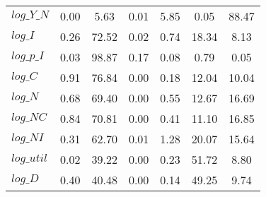 \begin{center}
\begin{longtable}{lcccccc}
$log\_Y\_N  $	 & 	        0.00	 & 	        5.63	 & 	        0.01	 & 	        5.85	 & 	        0.05	 & 	       88.47 \\ 
$log\_I     $	 & 	        0.26	 & 	       72.52	 & 	        0.02	 & 	        0.74	 & 	       18.34	 & 	        8.13 \\ 
$log\_p\_I  $	 & 	        0.03	 & 	       98.87	 & 	        0.17	 & 	        0.08	 & 	        0.79	 & 	        0.05 \\ 
$log\_C     $	 & 	        0.91	 & 	       76.84	 & 	        0.00	 & 	        0.18	 & 	       12.04	 & 	       10.04 \\ 
$log\_N     $	 & 	        0.68	 & 	       69.40	 & 	        0.00	 & 	        0.55	 & 	       12.67	 & 	       16.69 \\ 
$log\_NC    $	 & 	        0.84	 & 	       70.81	 & 	        0.00	 & 	        0.41	 & 	       11.10	 & 	       16.85 \\ 
$log\_NI    $	 & 	        0.31	 & 	       62.70	 & 	        0.01	 & 	        1.28	 & 	       20.07	 & 	       15.64 \\ 
$log\_util  $	 & 	        0.02	 & 	       39.22	 & 	        0.00	 & 	        0.23	 & 	       51.72	 & 	        8.80 \\ 
$log\_D     $	 & 	        0.40	 & 	       40.48	 & 	        0.00	 & 	        0.14	 & 	       49.25	 & 	        9.74 \\ 
\end{longtable}
 \end{center}
